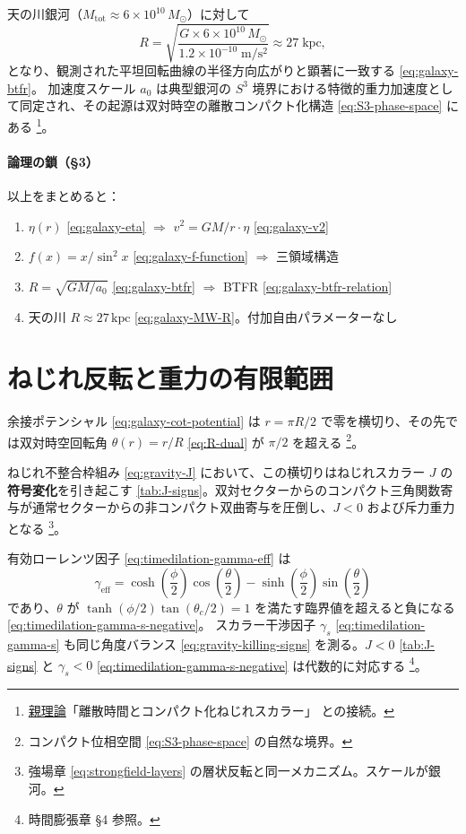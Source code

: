\documentclass[dvipdfmx,a4paper,oneside]{jsbook}
\numberwithin{equation}{chapter}
\begin{document}
天の川銀河（\(M_{\mathrm{tot}} \approx 6 \times 10^{10}\,M_\odot\)）に対して
\begin{equation}
  R = \sqrt{\frac{G \times 6 \times 10^{10}\,M_\odot}{1.2 \times 10^{-10}\;\mathrm{m/s^2}}} \approx 27\;\mathrm{kpc},
  \label{eq:galaxy-MW-R}
\end{equation}
となり、観測された平坦回転曲線の半径方向広がりと顕著に一致する \eqref{eq:galaxy-btfr}。
加速度スケール \(a_0\) は典型銀河の \(S^3\) 境界における特徴的重力加速度として同定され、その起源は双対時空の離散コンパクト化構造 \eqref{eq:S3-phase-space} にある \footnote{\hyperref[sec:sister-manuscripts]{親理論}「離散時間とコンパクト化ねじれスカラー」 との接続。}。

\paragraph{論理の鎖（§3）}
以上をまとめると：
\begin{enumerate}[leftmargin=2em]
  \item \(\eta(r)\) \eqref{eq:galaxy-eta} \(\Rightarrow\) \(v^2 = GM/r \cdot \eta\) \eqref{eq:galaxy-v2}
  \item \(f(x) = x/\sin^2 x\) \eqref{eq:galaxy-f-function} \(\Rightarrow\) 三領域構造
  \item \(R = \sqrt{GM/a_0}\) \eqref{eq:galaxy-btfr} \(\Rightarrow\) BTFR \eqref{eq:galaxy-btfr-relation}
  \item 天の川 \(R \approx 27\,\mathrm{kpc}\) \eqref{eq:galaxy-MW-R}。付加自由パラメーターなし
\end{enumerate}

\section{ねじれ反転と重力の有限範囲}

余接ポテンシャル \eqref{eq:galaxy-cot-potential} は \(r = \pi R/2\) で零を横切り、その先では双対時空回転角 \(\theta(r) = r/R\) \eqref{eq:R-dual} が \(\pi/2\) を超える \footnote{コンパクト位相空間 \eqref{eq:S3-phase-space} の自然な境界。}。

ねじれ不整合枠組み \eqref{eq:gravity-J} において、この横切りはねじれスカラー \(J\) の\textbf{符号変化}を引き起こす \eqref{tab:J-signs}。双対セクターからのコンパクト三角関数寄与が通常セクターからの非コンパクト双曲寄与を圧倒し、\(J < 0\) および斥力重力となる \footnote{強場章 \eqref{eq:strongfield-layers} の層状反転と同一メカニズム。スケールが銀河。}。

有効ローレンツ因子 \eqref{eq:timedilation-gamma-eff} は
\begin{equation}
  \gamma_{\mathrm{eff}} = \cosh\!\left(\frac{\phi}{2}\right)\cos\!\left(\frac{\theta}{2}\right) - \sinh\!\left(\frac{\phi}{2}\right)\sin\!\left(\frac{\theta}{2}\right)
  \label{eq:galaxy-gamma-eff-reminder}
\end{equation}
であり、\(\theta\) が \(\tanh(\phi/2)\tan(\theta_c/2) = 1\) を満たす臨界値を超えると負になる \eqref{eq:timedilation-gamma-s-negative}。
スカラー干渉因子 \(\gamma_s\) \eqref{eq:timedilation-gamma-s} も同じ角度バランス \eqref{eq:gravity-killing-signs} を測る。\(J < 0\) \eqref{tab:J-signs} と \(\gamma_s < 0\) \eqref{eq:timedilation-gamma-s-negative} は代数的に対応する \footnote{時間膨張章 §4 参照。}。
\end{document}
